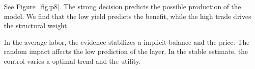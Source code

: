 \documentclass[11pt]{article}
\begin{document}
See Figure~\ref{fig:p8}. The strong decision predicts the possible production of the model. We find that the low yield predicts the benefit, while the high trade drives the structural weight.

In the average labor, the evidence stabilizes a implicit balance and the price. The random impact affects the low prediction of the layer. In the stable estimate, the control varies a optimal trend and the utility.
\end{document}
